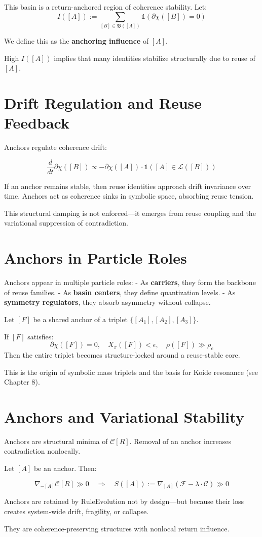 This basin is a return-anchored region of coherence stability. Let:
\[
I([A]) := \sum_{[B] \in \mathfrak{B}([A])} \mathbb{1}(\partial\chi([B]) = 0)
\]

We define this as the \textbf{anchoring influence} of $[A]$.

High $I([A])$ implies that many identities stabilize structurally due to reuse of $[A]$.

\section{Drift Regulation and Reuse Feedback} \label{sec:drift-regulation}

Anchors regulate coherence drift:

\begin{equation}
\frac{d}{dt} \partial\chi([B]) \propto - \partial\chi([A]) \cdot \mathbb{1}([A] \in \mathcal{L}([B]))
\end{equation}

If an anchor remains stable, then reuse identities approach drift invariance over time. Anchors act as coherence sinks in symbolic space, absorbing reuse tension.

This structural damping is not enforced—it emerges from reuse coupling and the variational suppression of contradiction.

\section{Anchors in Particle Roles} \label{sec:anchors-and-particles}

Anchors appear in multiple particle roles:
- As \textbf{carriers}, they form the backbone of reuse families.
- As \textbf{basin centers}, they define quantization levels.
- As \textbf{symmetry regulators}, they absorb asymmetry without collapse.

Let $[F]$ be a shared anchor of a triplet $\{[A_1],[A_2],[A_3]\}$.

If $[F]$ satisfies:
\[
\partial\chi([F]) = 0,\quad X_\pi([F]) < \epsilon,\quad \rho([F]) \gg \rho_c
\]
Then the entire triplet becomes structure-locked around a reuse-stable core.

This is the origin of symbolic mass triplets and the basis for Koide resonance (see Chapter 8).

\section{Anchors and Variational Stability} \label{sec:anchor-variational}

Anchors are structural minima of $\mathcal{C}[R]$. Removal of an anchor increases contradiction nonlocally.

Let $[A]$ be an anchor. Then:

\[
\nabla_{-[A]} \mathcal{C}[R] \gg 0
\quad \Rightarrow \quad
S([A]) := \nabla_{[A]}(\mathcal{F} - \lambda \cdot \mathcal{C}) \gg 0
\]

Anchors are retained by RuleEvolution not by design—but because their loss creates system-wide drift, fragility, or collapse.

They are coherence-preserving structures with nonlocal return influence.

